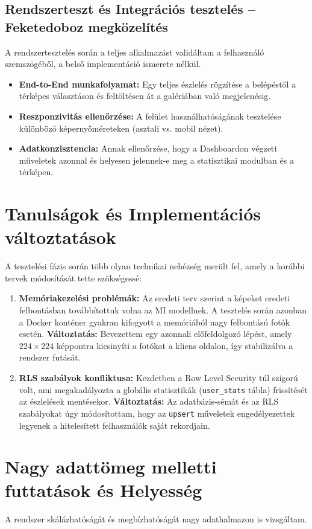 \documentclass[
	parspace, %
]{elteikthesis}[2024/04/26]
\begin{document}
\subsection{Rendszerteszt és Integrációs tesztelés -- Feketedoboz megközelítés}
A rendszertesztelés során a teljes alkalmazást validáltam a felhasználó szemszögéből, a belső implementáció ismerete nélkül.

\begin{itemize}
    \item \textbf{End-to-End munkafolyamat:} Egy teljes észlelés rögzítése a belépéstől a térképes választáson és feltöltésen át a galériában való megjelenésig.
    \item \textbf{Reszponzivitás ellenőrzése:} A felület használhatóságának tesztelése különböző képernyőméreteken (asztali vs. mobil nézet).
    \item \textbf{Adatkonzisztencia:} Annak ellenőrzése, hogy a Dashboardon végzett műveletek azonnal és helyesen jelennek-e meg a statisztikai modulban és a térképen.
\end{itemize}

\section{Tanulságok és Implementációs változtatások}
A tesztelési fázis során több olyan technikai nehézség merült fel, amely a korábbi tervek módosítását tette szükségessé:

\begin{enumerate}
    \item \textbf{Memóriakezelési problémák:} Az eredeti terv szerint a képeket eredeti felbontásban továbbítottuk volna az MI modellnek. A tesztelés során azonban a Docker konténer gyakran kifogyott a memóriából nagy felbontású fotók esetén. \textbf{Változtatás:} Bevezettem egy azonnali előfeldolgozó lépést, amely $224 \times 224$ képpontra kicsinyíti a fotókat a kliens oldalon, így stabilizálva a rendszer futását.
    \item \textbf{RLS szabályok konfliktusa:} Kezdetben a Row Level Security túl szigorú volt, ami megakadályozta a globális statisztikák (\texttt{user\_stats} tábla) frissítését az észlelések mentésekor. \textbf{Változtatás:} Az adatbázis-sémát és az RLS szabályokat úgy módosítottam, hogy az \texttt{upsert} műveletek engedélyezettek legyenek a hitelesített felhasználók saját rekordjain.
\end{enumerate}

\section{Nagy adattömeg melletti futtatások és Helyesség}
A rendszer skálázhatóságát és megbízhatóságát nagy adathalmazon is vizsgáltam.
\end{document}
